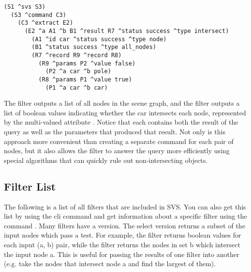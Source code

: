 \begin{verbatim}
(S1 ^svs S3)
  (S3 ^command C3)
    (C3 ^extract E2)
      (E2 ^a A1 ^b B1 ^result R7 ^status success ^type intersect)
        (A1 ^id car ^status success ^type node)
        (B1 ^status success ^type all_nodes)
        (R7 ^record R9 ^record R8)
          (R9 ^params P2 ^value false)
            (P2 ^a car ^b pole)
          (R8 ^params P1 ^value true)
            (P1 ^a car ^b car)
\end{verbatim}

The  filter outputs a list of all nodes in the scene graph, and the  filter outputs a list of boolean values indicating whether the car intersects each node, represented by the multi-valued attribute .
Notice that each  contains both the result of the query as well as the parameters that produced that result.
Not only is this approach more convenient than creating a separate command for each pair of nodes, but it also allows the  filter to answer the query more efficiently using special algorithms that can quickly rule out non-intersecting objects.


\subsection{Filter List}

The following is a list of all filters that are included in SVS.
You can also get this list by using the cli command  and
get information about a specific filter using the command .
Many filters have a  version. The select version returns a subset
of the input nodes which pass a test. For example, the  filter returns
boolean values for each input (a, b) pair, while the  filter
returns the nodes in set b which intersect the input node a. This is useful for passing
the results of one filter into another (e.g. take the nodes that intersect node a and find
the largest of them).

